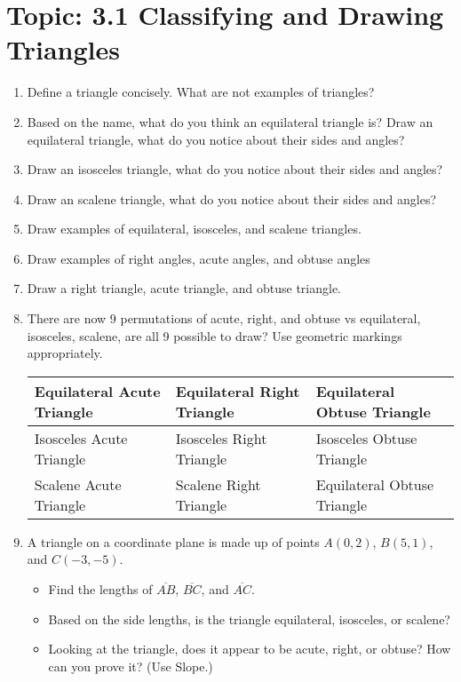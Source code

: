 \documentclass[12pt,letterpaper]{article}
\begin{document}
\section*{Topic: 3.1 Classifying and Drawing Triangles}
\begin{enumerate}[label=\arabic*.]
    \item Define a triangle concisely. What are not examples of triangles?
    \item Based on the name, what do you think an equilateral triangle is? Draw an equilateral triangle, what do you notice about their sides and angles?
    \item Draw an isosceles triangle, what do you notice about their sides and angles?
    \item Draw an scalene triangle, what do you notice about their sides and angles?
    \item Draw examples of equilateral, isosceles, and scalene triangles.
    \item Draw examples of right angles, acute angles, and obtuse angles
    \item Draw a right triangle, acute triangle, and obtuse triangle.
    \item There are now 9 permutations of acute, right, and obtuse vs equilateral, isosceles, scalene, are all 9 possible to draw? Use geometric markings appropriately.

          \begin{tabularx}{0.95\textwidth} {
                  | >{\centering\arraybackslash}X
                  | >{\centering\arraybackslash}X
                  | >{\centering\arraybackslash}X |}
              \hline
              Equilateral Acute Triangle\vspace{25mm} & Equilateral Right Triangle & Equilateral Obtuse Triangle \\
              \hline
              Isosceles Acute Triangle\vspace{25mm}   & Isosceles Right Triangle   & Isosceles Obtuse Triangle   \\
              \hline
              Scalene Acute Triangle\vspace{25mm}     & Scalene Right Triangle     & Equilateral Obtuse Triangle \\
              \hline
          \end{tabularx}
    \item A triangle on a coordinate plane is made up of points $A(0, 2)$, $B(5, 1)$, and $C(-3, -5)$.
          \begin{itemize}
              \item Find the lengths of $\overline{AB}$, $\overline{BC}$, and $\overline{AC}$.
              \item Based on the side lengths, is the triangle equilateral, isosceles, or scalene?
              \item Looking at the triangle, does it appear to be acute, right, or obtuse? How can you prove it? (Use Slope.)
          \end{itemize}
\end{enumerate}
\end{document}
